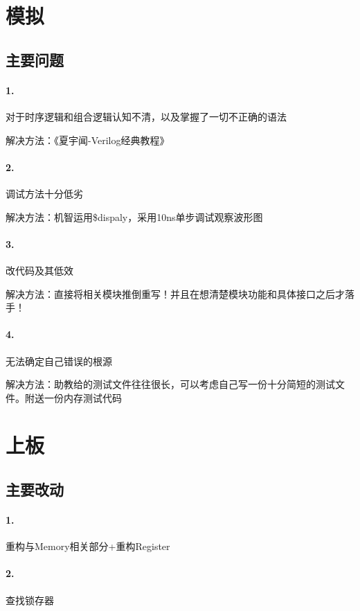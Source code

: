\documentclass[a4paper,10pt,oneside]{article}
\begin{document}
\section{模拟}
\subsection{主要问题}

\paragraph{1.} 对于时序逻辑和组合逻辑认知不清，以及掌握了一切不正确的语法

解决方法：《夏宇闻-Verilog经典教程》

\paragraph{2.} 调试方法十分低劣

解决方法：机智运用\$dispaly，采用10ns单步调试观察波形图

\paragraph{3.} 改代码及其低效

解决方法：直接将相关模块推倒重写！并且在想清楚模块功能和具体接口之后才落手！

\paragraph{4.} 无法确定自己错误的根源

解决方法：助教给的测试文件往往很长，可以考虑自己写一份十分简短的测试文件。附送一份内存测试代码

\section{上板}
\subsection{主要改动}

\paragraph{1.} 重构与Memory相关部分+重构Register

\paragraph{2.} 查找锁存器
\end{document}
